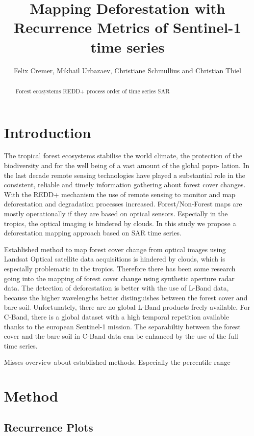 \documentclass{article}
\title{Mapping Deforestation with Recurrence Metrics of Sentinel-1 time series}
\author{Felix Cremer, Mikhail Urbazaev, Christiane Schmullius and Christian Thiel}
\begin{document}
\maketitle
\begin{abstract}
  Forest ecosystems
  REDD+ process
  order of time series
  SAR

%
\end{abstract}
\section{Introduction}
The tropical forest ecosystems stabilise the world climate\cite{}, the protection of the biodiversity \cite{} and
for the well being of a vast amount of the global popu-
lation\cite{}.
 In the last decade remote sensing technologies have
played a substantial role in the consistent, reliable and timely
information gathering about forest cover changes. With the
REDD+ mechanism the use of remote sensing to monitor
and map deforestation and degradation processes increased.
Forest/Non-Forest maps are mostly operationally if
they are based on optical sensors. Especially in the tropics,
the optical imaging is hindered by clouds. In this study we
 propose a deforestation mapping approach based on SAR time
series.

Established method to map forest cover change from optical images using Landsat \cite{Hansen}
Optical satellite data acquisitions is hindered by clouds, which is especially problematic in the tropics.
Therefore there has been some research going into the mapping of forest cover change using synthetic aperture radar data.
The detection of deforestation is better with the use of L-Band data, because the higher wavelengths better distinguishes between the forest cover and bare soil.
Unfortunately, there are no global L-Band products freely available.
For C-Band, there is a global dataset with a high temporal repetition available thanks to the european Sentinel-1 mission.
The separabiltiy between the forest cover and the bare soil in C-Band data can be enhanced by the use of the full time series.


Misses overview about established methods.
Especially the percentile range

\section{Method}

\subsection{Recurrence Plots}
\end{document}
